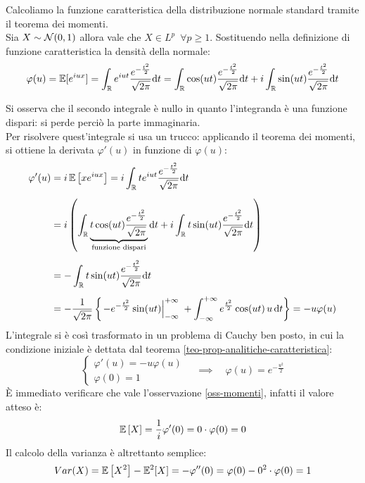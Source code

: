 \begin{ese} Calcoliamo la funzione caratteristica della distribuzione normale standard tramite il teorema dei momenti.\\
  \label{caratt-normale}
  Sia $X\sim \mathcal N(0,1)$ allora vale che $X \in L^p \enspace\forall p \geq 1$. Sostituendo nella definizione di funzione caratteristica la densità della normale:
  \begin{align*}
    \varphi (u) = \mathbb E[e^{i u x}]=\int_{\mathbb R}e^{iut}\frac{e^{-\frac{t^2}{2}}}{\sqrt{2\pi}}\mathrm d t
    =\int_{\mathbb R} \cos(ut)\frac{e^{-\frac{t^2}{2}}}{\sqrt{2\pi}}\mathrm d t + i\int_{\mathbb R}\sin(ut)\frac{e^{-\frac{t^2}{2}}}{\sqrt{2\pi}}\mathrm d t
  \end{align*}

  Si osserva che il secondo integrale è nullo in quanto l'integranda è una funzione dispari: si perde perciò la parte immaginaria. \\
  Per risolvere quest'integrale si usa un trucco: applicando il teorema dei momenti, si ottiene la derivata $\varphi' (u)$ in funzione di $\varphi (u)$:
  \begin{align*}
    \varphi' (u) & = i \, \mathbb E\left[x e^{i u x}\right] = i \int_\mathbb R t e^{iut}\frac{e^{-\frac{t^2}{2}}}{\sqrt{2\pi}}\mathrm d t \\[5pt]
    &= i \left( \int_\mathbb R \underbrace{t \cos(ut) \frac{e^{-\frac{t^2}{2}}}{\sqrt{2\pi}}}_{\text{funzione dispari}}\mathrm d t
    + i \int_\mathbb R t \sin(ut) \frac{e^{-\frac{t^2}{2}}}{\sqrt{2\pi}}\mathrm d t \right) \\[5pt]
    &= -\int_\mathbb R t \sin(ut)\frac{e^{-\frac{t^2}{2}}}{\sqrt{2\pi}}\mathrm d t\\[5pt]
    & = -\frac{1}{\sqrt{2 \pi}}\left\{ \left. -e^{-\frac{t^2}{2}} \sin (ut) \right|_{-\infty}^{+\infty} \; +\int_{-\infty}^{+\infty}e^{\frac{t^2}2} \cos (ut) \, u \, \mathrm d t \right\}=-u \varphi (u)
  \end{align*}
  L'integrale si è così trasformato in un problema di Cauchy ben posto, in cui la condizione iniziale è dettata dal teorema \ref{teo-prop-analitiche-caratteristica}:
  $$\begin{cases}
    \varphi'(u)=-u\varphi(u) \\ \varphi(0)=1
  \end{cases} \quad \implies \quad \varphi(u)=e^{-\frac{u^2}{2}}$$
  È immediato verificare che vale l'osservazione \ref{oss-momenti}, infatti il valore atteso è:
  $$\mathbb E \left[ X \right] = \frac{1}{i} \varphi'(0) = 0 \cdot \varphi(0) = 0$$
  Il calcolo della varianza è altrettanto semplice:
  $$Var(X) = \mathbb E \left[ X^2 \right] - \mathbb E^2[X] = -\varphi''(0) = \varphi(0) - 0^2 \cdot \varphi(0) = 1$$
\end{ese}

